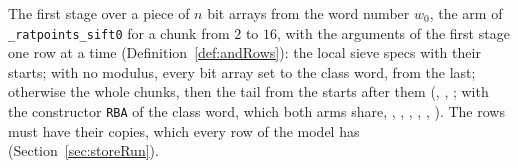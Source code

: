 \begin{definition}\label{def:andRowsChunked}
  \leanok
  The first stage over a piece of $n$ bit arrays from the word number $w_0$, the arm of
  \verb|_ratpoints_sift0| for a chunk from $2$ to $16$, with the arguments of the first stage one
  row at a time (Definition~\ref{def:andRows}): the local sieve specs with their starts; with no
  modulus, every bit array set to the class word, from the last; otherwise the whole chunks, then
  the tail from the starts after them (, ,
  ; with the constructor \verb|RBA| of the class word, which both arms
  share, , ,
  , ,
  , ). The rows must have their
  copies, which every row of the model has (Section~\ref{sec:storeRun}).
\end{definition}

